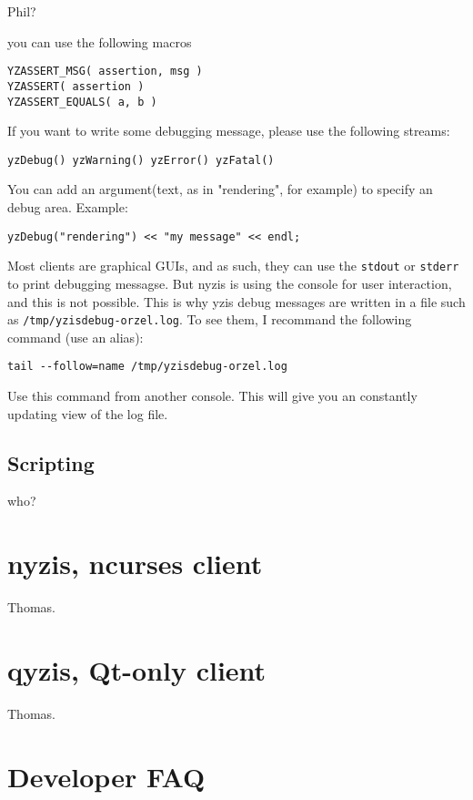 \documentclass[a4paper,12pt]{report}
\begin{document}
Phil?

you can use the following macros
\begin{verbatim}
YZASSERT_MSG( assertion, msg )
YZASSERT( assertion )
YZASSERT_EQUALS( a, b )
\end{verbatim}

If you want to write some debugging message, please use the following
streams:

\begin{verbatim}
yzDebug() yzWarning() yzError() yzFatal()
\end{verbatim}

You can add an argument(text, as in "rendering", for example) to specify an
debug area. Example:

\begin{verbatim}
yzDebug("rendering") << "my message" << endl;
\end{verbatim}

Most clients are graphical GUIs, and as such,
they can use the \verb+stdout+ or \verb+stderr+ to print debugging
messagse. But nyzis is using the console for user interaction, and this
is not possible. This is why yzis debug messages are written in a file such
as \verb+/tmp/yzisdebug-orzel.log+. To see them, I recommand the following
command (use an alias):

\begin{verbatim}
tail --follow=name /tmp/yzisdebug-orzel.log
\end{verbatim}

Use this command from another console. This will give you an constantly updating
view of the log file.

\section{Scripting}

who?

\chapter{nyzis, ncurses client}

Thomas.

\chapter{qyzis, Qt-only client}

Thomas.

\chapter{Developer FAQ}
\end{document}
